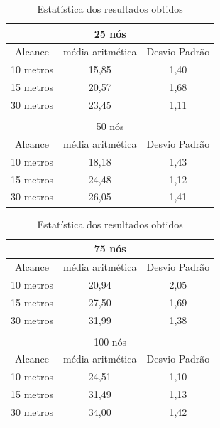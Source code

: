 	\begin{table}[!htb]
	    \caption{Estatística dos resultados obtidos}
	    \label{tab:estatiscaResultadosObtidosComInfraestrutura}
	    \centering
	    \tiny
	    \begin{minipage}{.5\linewidth}
	      
	      \centering
	        \begin{tabular}{|c|c|c|}

			\hline
			\multicolumn{3}{|c|}{25 nós} \\ \hline
			Alcance   & média aritmética &	Desvio Padrão   \\ \hline
			10 metros &	15,85 & 1,40   \\ \hline
			15 metros &	20,57 & 1,68   \\ \hline
			30 metros &	23,45 & 1,11  \\ \hline

			\multicolumn{3}{|c|}{} \\ \hline

			\multicolumn{3}{|c|}{50 nós} \\ \hline
			Alcance   & média aritmética &	Desvio Padrão   \\ \hline
			10 metros &	18,18 & 1,43   \\ \hline
			15 metros &	24,48 & 1,12  \\ \hline
			30 metros &	26,05 & 1,41  \\ \hline

		\end{tabular}
	    \end{minipage}%
	    \begin{minipage}{.5\linewidth}
	      \centering
	        \begin{tabular}{|c|c|c|}
	        \hline
			\multicolumn{3}{|c|}{75 nós} \\ \hline
			Alcance   & média aritmética &	Desvio Padrão   \\ \hline
			10 metros &	20,94 & 2,05   \\ \hline
			15 metros &	27,50 & 1,69   \\ \hline
			30 metros &	31,99 & 1,38 \\ \hline

			\multicolumn{3}{|c|}{} \\ \hline


			\multicolumn{3}{|c|}{100 nós} \\ \hline
			Alcance   & média aritmética &	Desvio Padrão   \\ \hline
			10 metros &	24,51 & 1,10   \\ \hline
			15 metros &	31,49 & 1,13   \\ \hline
			30 metros &	34,00 & 1,42  \\ \hline

		\end{tabular}

	    \end{minipage} 
	\end{table} 
